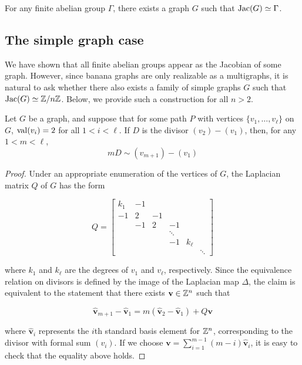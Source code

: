 \documentclass{amsart}
\newcommand{\bv}[1]{\widehat{\mathbf{#1}}}
\begin{document}
\begin{cor}
  For any finite abelian group $\Gamma$, there exists a graph $G$ such
  that $\operatorname{Jac}(G) \simeq \Gamma$. 
\end{cor}

\subsection{The simple graph case}
We have shown that all finite abelian groups appear as the Jacobian of
some graph. However, since banana graphs are only realizable as a
multigraphs, it is natural to ask whether there also exists a family
of simple graphs $G$ such that $\operatorname{Jac}(G) \simeq \mathbb{Z}/n\mathbb{Z}$. Below, we
provide such a construction for all $n > 2$.

\begin{lem}
  \label{lem:2valent_path}
  Let $G$ be a graph, and suppose that for some path $P$ with vertices
  $\{v_1, \ldots, v_\ell\}$ on $G$, $\operatorname{val}(v_i) = 2$ for all $1 < i <
  \ell$. If $D$ is the divisor $(v_2) - (v_1)$, then, for any $1 < m <
  \ell$,
  \begin{equation*}
    mD \sim (v_{m+1}) - (v_1)
  \end{equation*}
\end{lem}
\begin{proof}
  Under an appropriate enumeration of the vertices of $G$, the
  Laplacian matrix $Q$ of $G$ has the form

  $$Q = \begin{bmatrix}
    k_1 & -1 \\
    -1 &  2 & -1 \\
    & -1 &  2 & -1 \\
    &    &    &  \ddots  \\
    &    &    &  -1 & k_\ell \\ 
    &    &    &     &    & \ddots
  \end{bmatrix}$$

  where $k_1$ and $k_\ell$ are the degrees of $v_1$ and $v_\ell$,
  respectively. Since the equivalence relation on divisors is defined
  by the image of the Laplacian map $\Delta$, the claim is equivalent
  to the statement that there exists $\mathbf{v} \in \mathbb{Z}^n$ such that

  \begin{equation*}
    \bv{v}_{m+1} - \bv{v}_1  = m(\bv{v}_2 - \bv{v}_1) + Q\mathbf{v}
  \end{equation*}

  where $\bv{v}_i$ represents the $i$th standard basis element for
  $\mathbb{Z}^n$, corresponding to the divisor with formal sum $(v_i)$. If we
  choose $\mathbf{v} = \sum_{i=1}^{m - 1}(m - i)\bv{v}_i$, it is
  easy to check that the equality above holds.
\end{proof}
\end{document}
